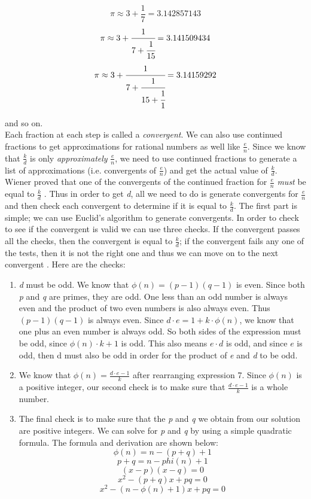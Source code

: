 \documentclass[11pt]{article}
\begin{document}
$$ \pi \approx 3 + \frac{1}{7} = 3.142857143$$
$$\pi \approx 3+\cfrac{1}{7+\cfrac{1}{15}} = 3.141509434$$
$$\pi \approx 3+\cfrac{1}{7+\cfrac{1}{15+\cfrac{1}{1}}} = 3.14159292 $$

and so on. \\

Each fraction at each step is called a \emph{convergent}. We can also use continued fractions to get approximations for rational numbers as well like $\frac{e}{n}$. Since we know that $\frac{k}{d}$ is only \emph{approximately} $\frac{e}{n}$, we need to use continued fractions to generate a list of approximations (i.e. convergents of $\frac{e}{n}$) and get the actual value of $\frac{k}{d}$. Wiener proved that one of the convergents of the continued fraction for $\frac{e}{n}$ \emph{must} be equal to $\frac{k}{d}$ \cite{boneh}. Thus in order to get \emph{d}, all we need to do is generate convergents for $\frac{e}{n}$ and then check each convergent to determine if it is equal to $\frac{k}{d}$. The first part is simple; we can use Euclid's algorithm to generate convergents. In order to check to see if the convergent is valid we can use three checks. If the convergent passes all the checks, then the convergent is equal to $\frac{k}{d}$; if the convergent fails any one of the tests, then it is not the right one and thus we can move on to the next convergent \cite{wieners-youtube}. Here are the checks:

\begin{enumerate}
	\item \emph{d} must be odd. We know that $\phi(n) = (p - 1)(q - 1)$ is even. Since both \emph{p} and \emph{q} are primes, they are odd. One less than an odd number is always even and the product of two even numbers is also always even. Thus $(p - 1)(q - 1)$ is always even. Since $d \cdot e = 1 + k \cdot \phi(n) $, we know that one plus an even number is always odd. So both sides of the expression must be odd, since $\phi(n) \cdot k + 1$ is odd. This also means $e \cdot d$ is odd, and since $e$ is odd, then d must also be odd in order for the product of \emph{e} and \emph{d} to be odd. 
	\item We know that $\phi(n) = \frac{d \cdot e  - 1}{k}$ after rearranging expression 7. Since $\phi(n)$ is a positive integer, our second check is to make sure that $\frac{d \cdot e  - 1}{k}$ is a whole number.
	\item The final check is to make sure that the \emph{p} and \emph{q} we obtain from our solution are positive integers. We can solve for \emph{p} and \emph{q} by using a simple quadratic formula. The formula and derivation are shown below:
		$$ \phi(n) = n - (p + q) + 1$$
		$$ p + q = n - phi(n) + 1$$
		$$ (x - p)(x - q) = 0$$
		$$ x^2 - (p + q)x + pq = 0$$
		$$ x^2 - (n - \phi(n) + 1)x + pq = 0$$
\end{enumerate}
\end{document}
